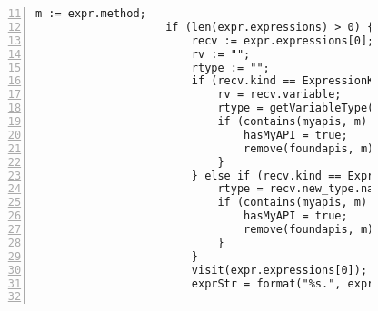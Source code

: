 \begin{figure}[ht!]
\begin{lstlisting}[numbers=left, tabsize=4, escapechar=@, caption={API Usage Mining Analysis},label={lst:aun-code}, firstline = 11, firstnumber = 11, lastline = 60]
                    m := expr.method;
                    if (len(expr.expressions) > 0) {
                        recv := expr.expressions[0];  
                        rv := ""; 
                        rtype := "";
                        if (recv.kind == ExpressionKind.VARACCESS) {
                            rv = recv.variable;
                            rtype = getVariableType(rv, true);
                            if (contains(myapis, m) && rtype != "") {
                                hasMyAPI = true;
                                remove(foundapis, m);
                            }
                        } else if (recv.kind == ExpressionKind.NEW) {
                            rtype = recv.new_type.name;
                            if (contains(myapis, m) && isAPIConstructor(recv.new_type.name)) {
                                hasMyAPI = true;    
                                remove(foundapis, m);
                            }
                        }
                        visit(expr.expressions[0]);
                        exprStr = format("%s.", exprStr);
                        

\end{lstlisting}
\end{figure}
